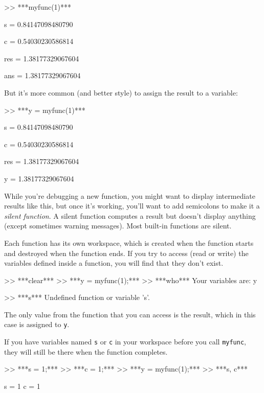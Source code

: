 \begin{code}
>> ***myfunc(1)***

s = 0.84147098480790

c = 0.54030230586814

res = 1.38177329067604

ans = 1.38177329067604
\end{code}

But it's more common (and better style) to assign the result to
a variable:

\begin{code}
>> ***y = myfunc(1)***

s = 0.84147098480790

c = 0.54030230586814

res = 1.38177329067604

y = 1.38177329067604
\end{code}

While you're debugging a new function, you might want to display
intermediate results like this, but once it's working, you'll want
to add semicolons to make it a \emph{silent function}.  A silent function
computes a result but doesn't display
anything (except sometimes warning messages). Most built-in
functions are silent.


Each function has its own workspace, which is created when the
function starts and destroyed when the function ends.  If you try to
access (read or write) the variables defined inside a function, you
will find that they don't exist.

\begin{code}
>> ***clear***
>> ***y = myfunc(1);***
>> ***who***
Your variables are: y

>> ***s***
Undefined function or variable 's'.
\end{code}

The only value from the function that you can access is the result,
which in this case is assigned to \lstinline{y}.

If you have variables named \lstinline{s} or \lstinline{c} in your workspace
before you call \lstinline{myfunc}, they will still be there when the
function completes.

\begin{code}
>> ***s = 1;***
>> ***c = 1;***
>> ***y = myfunc(1);***
>> ***s, c***

s = 1
c = 1
\end{code}

